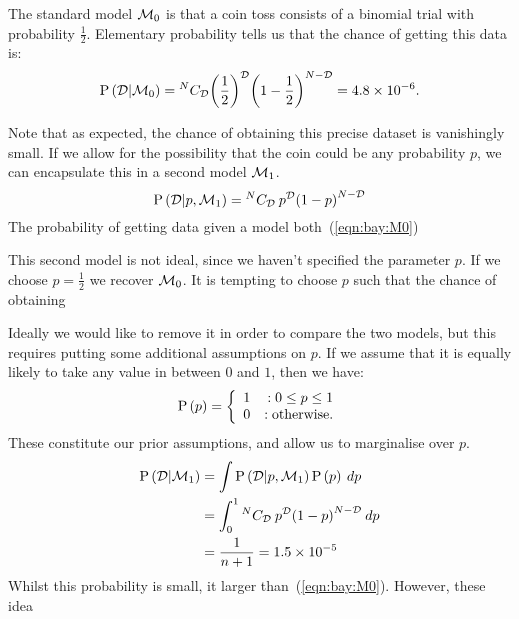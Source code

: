 The standard model $\mathcal{M}_0$ is that a coin toss consists of a binomial trial with probability $\frac{1}{2}$. Elementary probability tells us that the chance of getting this data is:
\begin{equation}
  \mathrm{P}\left(\mathcal{D}\middle|\mathcal{M}_0\right)= {^{N}C_{\mathcal{D}}} {\left( \frac{1}{2} \right)}^{\mathcal{D}} {\left(1 - \frac{1}{2} \right)}^{N-\mathcal{D}} = 4.8\times 10^{-6}.
  \label{eqn:bay:M0}
\end{equation}


Note that as expected, the chance of obtaining this precise dataset is vanishingly small.
If we allow for the possibility that the coin could be any probability $p$, we can encapsulate this in a second model $\mathcal{M}_1$.
\begin{equation}
  \mathrm{P}\left(\mathcal{D}\middle|p,\mathcal{M}_1\right)= {^{N}C_{\mathcal{D}}}\: {p}^{\mathcal{D}} {\left(1 - p \right)}^{N-\mathcal{D}} 
  \label{eqn:bay:M1}
\end{equation}
The probability of getting data given a model both~(\ref{eqn:bay:M0})


This second model is not ideal, since we haven't specified the parameter $p$. If we choose $p=\frac{1}{2}$ we recover $\mathcal{M}_0$. It is tempting to choose $p$ such that the chance of obtaining 


Ideally we would like to remove it in order to compare the two models, but this requires putting some additional assumptions on $p$. If we assume that it is equally likely to take any value in between $0$ and $1$, then we have:
\begin{equation}
  \mathrm{P}\left(p\right)=\left\{
  \begin{array}{lr}
    1 &:0\le p\le1\\
    0 &:\text{otherwise.}\\
  \end{array}
  \right.\label{eqn:bay:prior1}
\end{equation}
These constitute our prior assumptions, and allow us to marginalise over $p$.
\begin{align}
  \mathrm{P}\left(\mathcal{D}\middle|\mathcal{M}_1\right) 
  &= \int \mathrm{P}\left(\mathcal{D}\middle|p,\mathcal{M}_1\right)\mathrm{P}\left(p\right)\: dp \\
  &= \int_0^1 {^{N}C_{\mathcal{D}}}\: {p}^{\mathcal{D}} {\left(1 - p \right)}^{N-\mathcal{D}}\: dp \\
  &= \frac{1}{n+1} = 1.5\times10^{-5}
  \label{eqn:bay:marg}
\end{align}
Whilst this probability is small, it larger than~(\ref{eqn:bay:M0}). However, these idea

